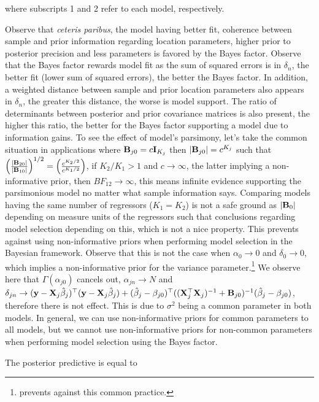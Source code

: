 where subscripts 1 and 2 refer to each model, respectively.

Observe that \textit{ceteris paribus}, the model having better fit, coherence between sample and prior information regarding location parameters, higher prior to posterior precision and less parameters is favored by the Bayes factor. Observe that the Bayes factor rewards model fit as the sum of squared errors is in $\delta_n$, the better fit (lower sum of squared errors), the better the Bayes factor. In addition, a weighted distance between sample and prior location parameters also appears in $\delta_n$, the greater this distance, the worse is model support. The ratio of determinants between posterior and prior covariance matrices is also present, the higher this ratio, the better for the Bayes factor supporting a model due to information gains. To see the effect of model's parsimony, let's take the common situation in applications where ${\bf{B}}_{j0}=c{\bf{I}}_{K_j}$ then $|{\bf{B}}_{j0}|=c^{K_j}$ such that $\left(\frac{|{\bf{B}}_{20}|}{|{\bf{B}}_{10}|}\right)^{1/2}=\left(\frac{c^{K_2/2}}{c^{K_1/2}}\right)$, if $K_2/K_1>1$ and $c\rightarrow\infty$, the latter implying a non-informative prior, then $BF_{12}\rightarrow\infty$, this means infinite evidence supporting the parsimonious model no matter what sample information says. Comparing models having the same number of regressors ($K_1=K_2$) is not a safe ground as $|{\bf{B}}_{0}|$ depending on measure units of the regressors such that conclusions regarding model selection depending on this, which is not a nice property. This prevents against using non-informative priors when performing model selection in the Bayesian framework. Observe that this is not the case when $\alpha_0\rightarrow 0$ and $\delta_0\rightarrow 0$, which implies a non-informative prior for the variance parameter.\footnote{\cite{gelman2006prior} prevents against this common practice.} We observe here that $\Gamma(\alpha_{j0})$ cancels out, $\alpha_{jn} \rightarrow N$ and $\delta_{jn}\rightarrow ({\bf{y}}-{\bf{X}}_j\hat{\beta}_j)^{\top}({\bf{y}}-{\bf{X}}_j\hat{\beta}_j)+(\hat{\beta}_j-\beta_{j0})^{\top}(({\bf{X}}_j^{\top}{\bf{X}}_j)^{-1}+{\bf{B}}_{j0})^{-1}(\hat{\beta}_j-\beta_{j0})$, therefore there is not effect. This is due to $\sigma^2$ being a common parameter in both models. In general, we can use non-informative priors for common parameters to all models, but we cannot use non-informative priors for non-common parameters when performing model selection using the Bayes factor. 


The posterior predictive is equal to

